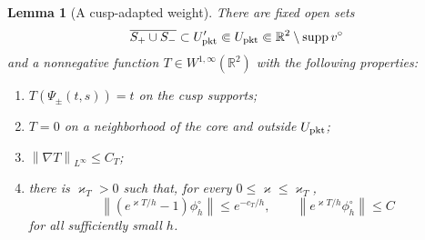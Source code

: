 \documentclass[11pt]{article}
\newtheorem{lemma}[theorem]{Lemma}
\newcommand{\R}{\mathbb R}
\newcommand{\norm}[1]{\left\|#1\right\|}
\newcommand{\supp}{\operatorname{supp}}
\begin{document}
\begin{lemma}[A cusp-adapted weight]\label{lem:cusp-weight}
There are fixed open sets
\[
 \overline{S_+\cup S_-}\subset U'_{\rm pkt}\Subset U_{\rm pkt}
 \Subset\R^2\setminus\supp v^\circ
\]
and a nonnegative function $T\in W^{1,\infty}(\R^2)$ with the following
properties:
\begin{enumerate}[label=\textup{(T\arabic*)},leftmargin=2.4em]
\item $T(\Psi_\pm(t,s))=t$ on the cusp supports;
\item $T=0$ on a neighborhood of the core and outside $U_{\rm pkt}$;
\item $\norm{\nabla T}_{L^\infty}\le C_T$;
\item there is $\varkappa_T>0$ such that, for every
$0\le\varkappa\le\varkappa_T$,
\begin{equation}\label{eq:cusp-weight-tail}
 \norm{(e^{\varkappa T/h}-1)\phi_h^\circ}
 \le e^{-c_T/h},
 \qquad
 \norm{e^{\varkappa T/h}\phi_h^\circ}\le C
\end{equation}
for all sufficiently small $h$.
\end{enumerate}
\end{lemma}
\end{document}

